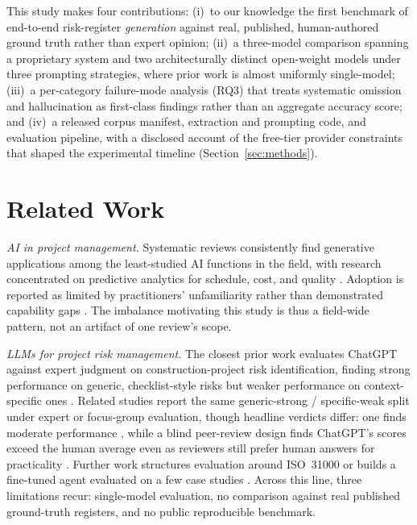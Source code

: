 \documentclass[10pt, conference, letterpaper]{IEEEtran}
\begin{document}
This study makes four contributions: (i)~to our knowledge the first
benchmark of end-to-end risk-register \emph{generation} against real,
published, human-authored ground truth rather than expert opinion; (ii)~a
three-model comparison spanning a proprietary system and two
architecturally distinct open-weight models under three prompting
strategies, where prior work is almost uniformly single-model; (iii)~a
per-category failure-mode analysis (RQ3) that treats systematic omission
and hallucination as first-class findings rather than an aggregate accuracy
score; and (iv)~a released corpus manifest, extraction and prompting code,
and evaluation pipeline, with a disclosed account of the free-tier provider
constraints that shaped the experimental timeline (Section~\ref{sec:methods}).

\section{Related Work}
\label{sec:related}

\textit{AI in project management.} Systematic reviews consistently find
generative applications among the least-studied AI functions in the field,
with research concentrated on predictive analytics for schedule, cost, and
quality
\cite{aidriven2026usecases,aitools2025knowledge,salimimoghadam2025rise,leveraging2025ai_pm,mapping2025ai_landscape}.
Adoption is reported as limited by practitioners' unfamiliarity rather than
demonstrated capability gaps \cite{aitools2025knowledge}. The imbalance
motivating this study is thus a field-wide pattern, not an artifact of one
review's scope.

\textit{LLMs for project risk management.} The closest prior work evaluates
ChatGPT against expert judgment on construction-project risk
identification, finding strong performance on generic, checklist-style
risks but weaker performance on context-specific ones
\cite{asce2025exploring_chatgpt_risk}. Related studies report the same
generic-strong / specific-weak split under expert or focus-group
evaluation, though headline verdicts differ: one finds moderate performance
\cite{aladag2023assessing_chatgpt}, while a blind peer-review design finds
ChatGPT's scores exceed the human average even as reviewers still prefer
human answers for practicality \cite{ecam2024chatgpt_exceed_humans}.
Further work structures evaluation around ISO~31000
\cite{esrel2023iso31000_chatgpt} or builds a fine-tuned agent evaluated on
a few case studies \cite{wen2025riskgpt}. Across this line, three
limitations recur: single-model evaluation, no comparison against real
published ground-truth registers, and no public reproducible benchmark.
\end{document}
